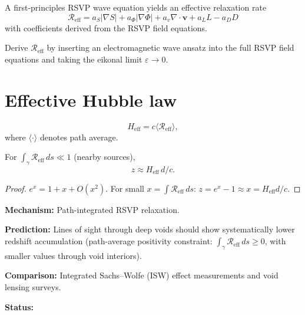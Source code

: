 \begin{conjecture}
  \label{conj:redshift-emergence}
  \statusconjectured{}
  A first-principles RSVP wave equation yields an effective
  relaxation rate
  \[
    \mathcal{R}_{\mathrm{eff}}
    = a_S|\nabla S| + a_\Phi|\nabla\Phi| + a_v\nabla\cdot\mathbf{v}
    + a_L L - a_D D
  \]
  with coefficients derived from the RSVP field equations.
\end{conjecture}

\begin{OpenQuestion}
  Derive $\mathcal{R}_{\mathrm{eff}}$ by inserting an
  electromagnetic wave ansatz into the full RSVP field equations
  and taking the eikonal limit $\varepsilon \to 0$.
\end{OpenQuestion}

\section{Effective Hubble law}

\begin{definition}
  \[
    H_{\mathrm{eff}} = c\langle\mathcal{R}_{\mathrm{eff}}\rangle,
  \]
  where $\langle\cdot\rangle$ denotes path average.
\end{definition}

\begin{proposition}
  \label{prop:hubble-local}
  \statusproven{}
  For $\int_\gamma\mathcal{R}_{\mathrm{eff}}\,ds \ll 1$
  (nearby sources),
  \[
    z \approx H_{\mathrm{eff}}\,d/c.
  \]
\end{proposition}

\begin{proof}
  $e^x = 1 + x + O(x^2)$.
  For small $x = \int\mathcal{R}_{\mathrm{eff}}\,ds$:
  $z = e^x - 1 \approx x = H_{\mathrm{eff}} d/c$.
\end{proof}

\begin{ObsConseq}
  \textbf{Mechanism:} Path-integrated RSVP relaxation.

  \textbf{Prediction:} Lines of sight through deep voids
  should show systematically lower redshift accumulation
  (path-average positivity constraint:
  $\int_\gamma\mathcal{R}_{\mathrm{eff}}\,ds \geq 0$,
  with smaller values through void interiors).

  \textbf{Comparison:} Integrated Sachs--Wolfe (ISW) effect
  measurements and void lensing surveys.

  \textbf{Status:} \statusconjectured{}
\end{ObsConseq}

